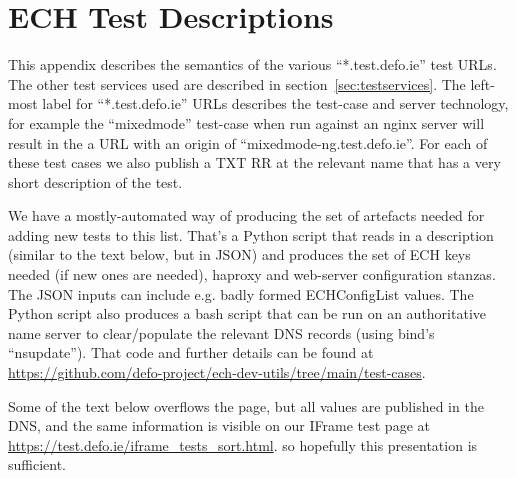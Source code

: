 \section{ECH Test Descriptions}
\label{app:testdescriptions}

This appendix describes the semantics of the various ``*.test.defo.ie'' test URLs.
The other test services used are described in section~\ref{sec:testservices}.
The left-most label for ``*.test.defo.ie'' URLs describes the test-case and server technology,
for example the ``mixedmode'' test-case when run against an nginx server will
result in the a URL with an origin of ``mixedmode-ng.test.defo.ie''. For each of
these test cases we also publish a TXT RR at the relevant name that has a very
short description of the test.

We have a mostly-automated way of producing the set of artefacts needed for
adding new tests to this list. That's a Python script that reads in a
description (similar to the text below, but in JSON) and produces the set of
ECH keys needed (if new ones are needed), haproxy and web-server configuration
stanzas. The JSON inputs can include e.g. badly formed ECHConfigList values.
The Python script also produces a bash script that can be run on an
authoritative name server to clear/populate the relevant DNS records (using
bind's ``nsupdate'').  That code and further  details can be found at
\url{https://github.com/defo-project/ech-dev-utils/tree/main/test-cases}.

Some of the text below overflows the page, but all values are published in the
DNS, and the same information is visible on our IFrame test page at
\url{https://test.defo.ie/iframe_tests_sort.html}.  so hopefully this
presentation is sufficient.

